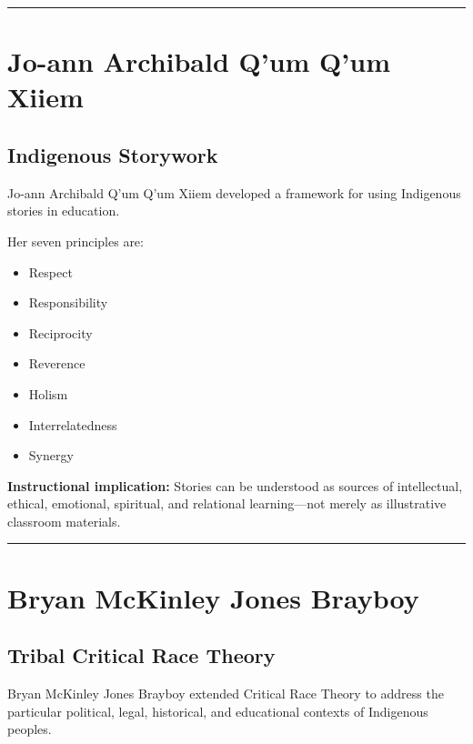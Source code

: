 \documentclass[
  letterpaper,
  DIV=11,
  numbers=noendperiod]{scrartcl}
\providecommand{\tightlist}{%
  \setlength{\itemsep}{0pt}\setlength{\parskip}{0pt}}\usepackage{longtable,booktabs,array}
\begin{document}
\begin{center}\rule{0.5\linewidth}{0.5pt}\end{center}

\section{Jo-ann Archibald Q'um Q'um
Xiiem}\label{jo-ann-archibald-qum-qum-xiiem}

\subsection{Indigenous Storywork}\label{indigenous-storywork}

Jo-ann Archibald Q'um Q'um Xiiem developed a framework for using
Indigenous stories in education.

Her seven principles are:

\begin{itemize}
\tightlist
\item
  Respect
\item
  Responsibility
\item
  Reciprocity
\item
  Reverence
\item
  Holism
\item
  Interrelatedness
\item
  Synergy
\end{itemize}

\textbf{Instructional implication:} Stories can be understood as sources
of intellectual, ethical, emotional, spiritual, and relational
learning---not merely as illustrative classroom materials.

\begin{center}\rule{0.5\linewidth}{0.5pt}\end{center}

\section{Bryan McKinley Jones
Brayboy}\label{bryan-mckinley-jones-brayboy}

\subsection{Tribal Critical Race
Theory}\label{tribal-critical-race-theory}

Bryan McKinley Jones Brayboy extended Critical Race Theory to address
the particular political, legal, historical, and educational contexts of
Indigenous peoples.
\end{document}
